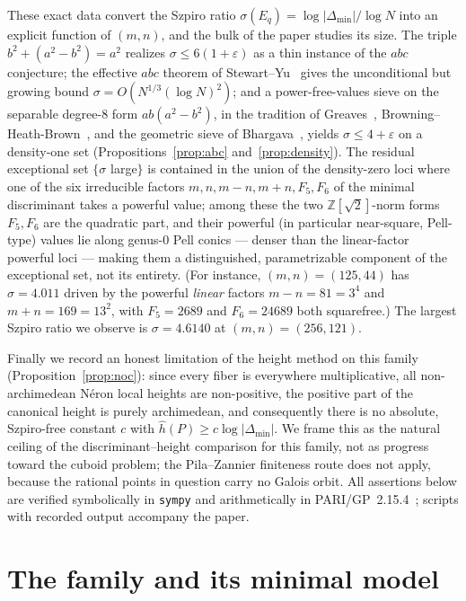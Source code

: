 \documentclass[11pt,reqno]{amsart}
\theoremstyle{plain}
\theoremstyle{definition}
\newcommand{\Z}{\mathbb{Z}}
\newcommand{\hath}{\hat{h}}
\begin{document}
These exact data convert the Szpiro ratio $\sigma(E_q)=\log|\Delta_{\min}|/\log N$
into an explicit function of $(m,n)$, and the bulk of the paper studies its size.
The triple $b^2+(a^2-b^2)=a^2$ realizes $\sigma\le 6(1+\varepsilon)$ as a thin
instance of the $abc$ conjecture; the effective $abc$ theorem of
Stewart--Yu~\cite{stewartyu} gives the unconditional but growing bound
$\sigma=O(N^{1/3}(\log N)^2)$; and a power-free-values sieve on the separable
degree-$8$ form $ab(a^2-b^2)$, in the tradition of
Greaves~\cite{greaves}, Browning--Heath-Brown~\cite{browning}, and the geometric
sieve of Bhargava~\cite{bhargava}, yields $\sigma\le 4+\varepsilon$ on a density-one
set (Propositions~\ref{prop:abc} and~\ref{prop:density}). The residual exceptional
set $\{\sigma$ large$\}$ is contained in the union of the density-zero loci where
one of the six irreducible factors $m,n,m-n,m+n,F_5,F_6$ of the minimal discriminant
takes a powerful value; among these the two $\Z[\sqrt2]$-norm forms $F_5,F_6$ are the
quadratic part, and their powerful (in particular near-square, Pell-type) values lie
along genus-$0$ Pell conics --- denser than the linear-factor powerful loci --- making
them a distinguished, parametrizable component of the exceptional set, not its
entirety. (For instance, $(m,n)=(125,44)$ has $\sigma=4.011$ driven by the powerful
\emph{linear} factors $m-n=81=3^4$ and $m+n=169=13^2$, with $F_5=2689$ and $F_6=24689$
both squarefree.) The largest Szpiro ratio we
observe is $\sigma=4.6140$ at $(m,n)=(256,121)$.

Finally we record an honest limitation of the height method on this family
(Proposition~\ref{prop:noc}): since every fiber is everywhere multiplicative, all
non-archimedean N\'eron local heights are non-positive, the positive part of the
canonical height is purely archimedean, and consequently there is no absolute,
Szpiro-free constant $c$ with $\hath(P)\ge c\log|\Delta_{\min}|$. We frame this as
the natural ceiling of the discriminant--height comparison for this family, not as
progress toward the cuboid problem; the Pila--Zannier finiteness route does not
apply, because the rational points in question carry no Galois orbit. All
assertions below are verified symbolically in \texttt{sympy} and arithmetically in
PARI/GP~2.15.4~\cite{pari}; scripts with recorded output accompany the paper.

\section{The family and its minimal model}
\end{document}
